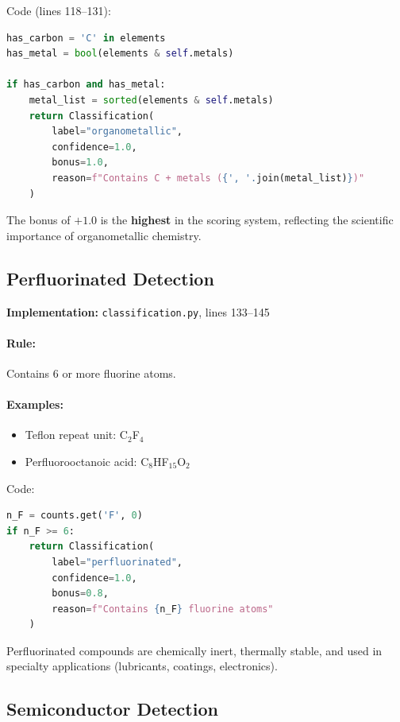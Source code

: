 \documentclass[11pt]{article}
\begin{document}
Code (lines 118--131):

\begin{lstlisting}[language=Python]
has_carbon = 'C' in elements
has_metal = bool(elements & self.metals)

if has_carbon and has_metal:
    metal_list = sorted(elements & self.metals)
    return Classification(
        label="organometallic",
        confidence=1.0,
        bonus=1.0,
        reason=f"Contains C + metals ({', '.join(metal_list)})"
    )
\end{lstlisting}

The bonus of $+1.0$ is the \textbf{highest} in the scoring system, reflecting the scientific importance of organometallic chemistry.

\subsection{Perfluorinated Detection}

\textbf{Implementation:} \texttt{classification.py}, lines 133--145

\paragraph{Rule:} Contains 6 or more fluorine atoms.

\paragraph{Examples:}
\begin{itemize}
\item Teflon repeat unit: C$_2$F$_4$
\item Perfluorooctanoic acid: C$_8$HF$_{15}$O$_2$
\end{itemize}

Code:

\begin{lstlisting}[language=Python]
n_F = counts.get('F', 0)
if n_F >= 6:
    return Classification(
        label="perfluorinated",
        confidence=1.0,
        bonus=0.8,
        reason=f"Contains {n_F} fluorine atoms"
    )
\end{lstlisting}

Perfluorinated compounds are chemically inert, thermally stable, and used in specialty applications (lubricants, coatings, electronics).

\subsection{Semiconductor Detection}
\end{document}
